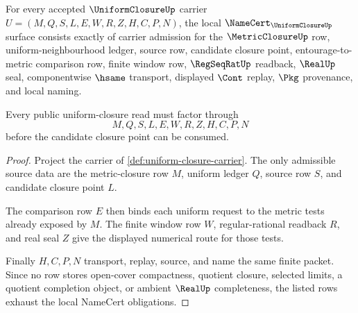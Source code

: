 \begin{theorem}
\label{thm:uniform-closure-namecert-obligations}
For every accepted $\UniformClosureUp$ carrier $U=(M,Q,S,L,E,W,R,Z,H,C,P,N)$, the local $\NameCert_{\UniformClosureUp}$ surface consists exactly of carrier admission for the $\MetricClosureUp$ row, uniform-neighbourhood ledger, source row, candidate closure point, entourage-to-metric comparison row, finite window row, $\RegSeqRatUp$ readback, $\RealUp$ seal, componentwise $\hsame$ transport, displayed $\Cont$ replay, $\Pkg$ provenance, and local naming.

Every public uniform-closure read must factor through
$$
M,Q,S,L,E,W,R,Z,H,C,P,N
$$
before the candidate closure point can be consumed.
\end{theorem}
\begin{proof}
Project the carrier of \autoref{def:uniform-closure-carrier}. The only admissible source data are the metric-closure row $M$, uniform ledger $Q$, source row $S$, and candidate closure point $L$.

The comparison row $E$ then binds each uniform request to the metric tests already exposed by $M$. The finite window row $W$, regular-rational readback $R$, and real seal $Z$ give the displayed numerical route for those tests.

Finally $H,C,P,N$ transport, replay, source, and name the same finite packet. Since no row stores open-cover compactness, quotient closure, selected limits, a quotient completion object, or ambient $\RealUp$ completeness, the listed rows exhaust the local NameCert obligations.
\end{proof}

